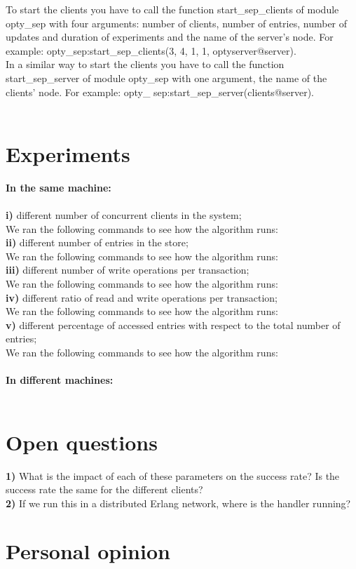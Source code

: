 \documentclass[a4paper, 11pt]{article}
\begin{document}
To start the clients you have to call the function start\_sep\_clients of module opty\_sep with four arguments: number of clients, number of entries, number of updates and duration of experiments and the name of the server’s node. For example: opty\_sep:start\_sep\_clients(3, 4, 1, 1, optyserver@server).\\
In a similar way to start the clients you have to call the function start\_sep\_server of module opty\_sep with one argument, the name of the clients' node. For example: opty\_ sep:start\_sep\_server(clients@server).\\\\

\section{Experiments}

\textbf{In the same machine:}\\\\
\textbf{i)} different number of concurrent clients in the system;\\
We ran the following commands to see how the algorithm runs:\\
%
\textbf{ii)} different number of entries in the store;\\
We ran the following commands to see how the algorithm runs:\\
%
\textbf{iii)} different number of write operations per transaction;\\
We ran the following commands to see how the algorithm runs:\\
%
\textbf{iv)} different ratio of read and write operations per transaction;\\
We ran the following commands to see how the algorithm runs:\\
%
\textbf{v)} different percentage of accessed entries with respect to the total number of entries;\\
We ran the following commands to see how the algorithm runs:\\\\

\textbf{In different machines:}\\\\


\section{Open questions}

\textbf{1)} What is the impact of each of these parameters on the success rate? Is the success rate the same for the different clients?\\
\textbf{2)} If we run this in a distributed Erlang network, where is the handler running?\\


\section{Personal opinion}
\end{document}
